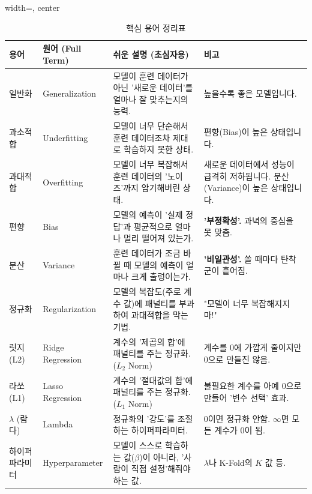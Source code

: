 \documentclass[11pt,a4paper]{book}
\theoremstyle{definition}
\begin{document}
\begin{table}[h!]
\caption{핵심 용어 정리표}
\label{tab:terms}
\begin{adjustbox}{width=\textwidth, center}
\begin{tabular}{@{}llll@{}}
\toprule
\textbf{용어} & \textbf{원어 (Full Term)} & \textbf{쉬운 설명 (초심자용)} & \textbf{비고} \\
\midrule
일반화 & Generalization & 모델이 훈련 데이터가 아닌 '새로운 데이터'를 얼마나 잘 맞추는지의 능력. & 높을수록 좋은 모델입니다. \\
\addlinespace
과소적합 & Underfitting & 모델이 너무 단순해서 훈련 데이터조차 제대로 학습하지 못한 상태. & 편향(Bias)이 높은 상태입니다. \\
\addlinespace
과대적합 & Overfitting & 모델이 너무 복잡해서 훈련 데이터의 '노이즈'까지 암기해버린 상태. & 새로운 데이터에서 성능이 급격히 저하됩니다. 분산(Variance)이 높은 상태입니다. \\
\addlinespace
편향 & Bias & 모델의 예측이 '실제 정답'과 평균적으로 얼마나 멀리 떨어져 있는가. & \textbf{'부정확성'.} 과녁의 중심을 못 맞춤. \\
\addlinespace
분산 & Variance & 훈련 데이터가 조금 바뀔 때 모델의 예측이 얼마나 크게 출렁이는가. & \textbf{'비일관성'.} 쏠 때마다 탄착군이 흩어짐. \\
\addlinespace
정규화 & Regularization & 모델의 복잡도(주로 계수 값)에 패널티를 부과하여 과대적합을 막는 기법. & "모델이 너무 복잡해지지 마!" \\
\addlinespace
릿지 (L2) & Ridge Regression & 계수의 '제곱의 합'에 패널티를 주는 정규화. ($L_2$ Norm) & 계수를 0에 가깝게 줄이지만 0으로 만들진 않음. \\
\addlinespace
라쏘 (L1) & Lasso Regression & 계수의 '절대값의 합'에 패널티를 주는 정규화. ($L_1$ Norm) & 불필요한 계수를 아예 0으로 만들어 '변수 선택' 효과. \\
\addlinespace
$\lambda$ (람다) & Lambda & 정규화의 '강도'를 조절하는 하이퍼파라미터. & 0이면 정규화 안함. $\infty$면 모든 계수가 0이 됨. \\
\addlinespace
하이퍼파라미터 & Hyperparameter & 모델이 스스로 학습하는 값($\beta$)이 아니라, '사람이 직접 설정'해줘야 하는 값. & $\lambda$나 K-Fold의 $K$ 값 등. \\
\bottomrule
\end{tabular}
\end{adjustbox}
\end{table}


\end{document}

